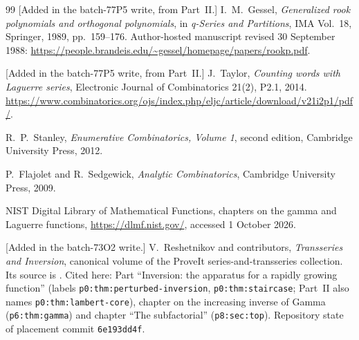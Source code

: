 \documentclass[11pt,letterpaper]{article}
\theoremstyle{definition}
\theoremstyle{remark}
\begin{document}
\begin{thebibliography}{99}
[Added in the batch-77P5 write, from Part~II.]
I.~M.~Gessel,
\emph{Generalized rook polynomials and orthogonal polynomials}, in
\emph{q-Series and Partitions}, IMA Vol.~18, Springer, 1989, pp.~159--176.
Author-hosted manuscript revised 30 September 1988:
\url{https://people.brandeis.edu/~gessel/homepage/papers/rookp.pdf}.

[Added in the batch-77P5 write, from Part~II.]
J.~Taylor,
\emph{Counting words with Laguerre series}, Electronic Journal of
Combinatorics 21(2), P2.1, 2014.
\url{https://www.combinatorics.org/ojs/index.php/eljc/article/download/v21i2p1/pdf/}.

R.~P.~Stanley,
\emph{Enumerative Combinatorics, Volume 1}, second edition,
Cambridge University Press, 2012.

P.~Flajolet and R.~Sedgewick,
\emph{Analytic Combinatorics}, Cambridge University Press, 2009.

NIST Digital Library of Mathematical Functions,
chapters on the gamma and Laguerre functions,
\url{https://dlmf.nist.gov/}, accessed 1 October 2026.

\begingroup\raggedright
[Added in the batch-73O2 write.] V.~Reshetnikov and contributors,
\emph{Transseries and Inversion}, canonical volume of the ProveIt
series-and-transseries collection.  Its source is
\allowbreak
{}.  Cited here:
Part ``Inversion: the apparatus for a rapidly growing function''
(labels \texttt{p0:thm:perturbed-inversion}, \texttt{p0:thm:staircase};
Part~II also names \texttt{p0:thm:lambert-core}),
chapter on the increasing inverse of Gamma (\texttt{p6:thm:gamma}) and chapter
``The subfactorial'' (\texttt{p8:sec:top}).  Repository state of placement
commit \texttt{6e193dd4f}.\par\endgroup

\end{thebibliography}
\end{document}
